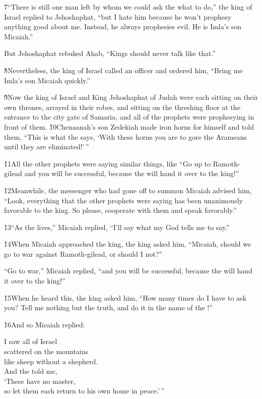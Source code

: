 \v{7}``There is still one man left by whom we could ask the  what to do,'' the king of Israel replied to Jehoshaphat, ``but I hate him because he won't prophesy anything good about me. Instead, he always prophesies evil. He is Imla's son Micaiah.''

But Jehoshaphat rebuked Ahab, ``Kings should never talk like that.''

\v{8}Nevertheless, the king of Israel called an officer and ordered him, ``Bring me Imla's son Micaiah quickly.''

\v{9}Now the king of Israel and King Jehoshaphat of Judah were each sitting on their own thrones, arrayed in their robes, and sitting on the threshing floor at the entrance to the city gate of Samaria, and all of the prophets were prophesying in front of them. \v{10}Chenaanah's son Zedekiah made iron horns for himself and told them, ``This is what the  says, `With these horns you are to gore the Arameans until they are eliminated!'\,''

\v{11}All the other prophets were saying similar things, like ``Go up to Ramoth-gilead and you will be successful, because the  will hand it over to the king!''

\v{12}Meanwhile, the messenger who had gone off to summon Micaiah advised him, ``Look, everything that the other prophets were saying has been unanimously favorable to the king. So please, cooperate with them and speak favorably.''

\v{13}``As the  lives,'' Micaiah replied, ``I'll say what my God tells me to say.''

\v{14}When Micaiah approached the king, the king asked him, ``Micaiah, should we go to war against Ramoth-gilead, or should I not?''

``Go to war,'' Micaiah replied, ``and you will be successful, because the  will hand it over to the king!''

\v{15}When he heard this, the king asked him, ``How many times do I have to ask you? Tell me nothing but the truth, and do it in the name of the !''

\v{16}And so Micaiah replied:

\begin{poetry}
\poeml I saw all of Israel \\
\poemll    scattered on the mountains \\
\poemlll       like sheep without a shepherd. \\
\poeml And the  told me, \\
\poemll    `These have no master, \\
\poemlll       so let them each return to his own home in peace.'\,''
\end{poetry}

